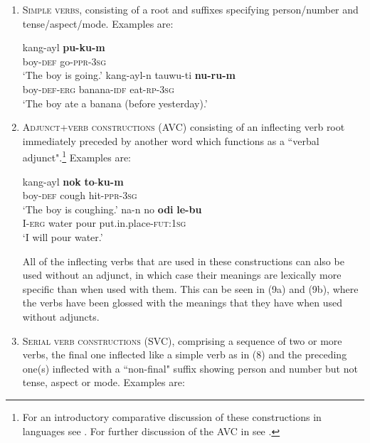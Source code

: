 \documentclass[output=paper]{langsci/langscibook}
\begin{document}
\begin{enumerate}
\item  \textsc{Simple verbs,} consisting of a root and suffixes specifying person/number and tense/aspect/mode. Examples are:

\ea
\ea
\gll   kang-ayl      \textbf{pu-ku-m}   \\
            boy-\textsc{def}      go-\textsc{ppr}-\textsc{3sg}     \\
\glt            `The boy is going.'                   
\ex
\gll kang-ayl-n       tauwu-ti      \textbf{nu-ru-m}\\
       boy-\textsc{def}-\textsc{erg}    banana-\textsc{idf}  eat-\textsc{rp}-\textsc{3sg}\\
\glt  `The boy ate a banana (before yesterday).'
\z
\z

 \item  \textsc{Adjunct+verb constructions (AVC)} consisting of an inflecting verb root immediately preceded by another word which functions as a  ``verbal adjunct".\footnote{For an introductory comparative discussion of these constructions in  languages see \citet[117--123]{Foley1986}. For further discussion of the AVC in  see \citet{MerlanForthcoming}.} Examples are: 

\ea
  \ea
  \gll kang-ayl      \textbf{nok}      \textbf{to}-\textbf{ku-m}     \\
      boy-\textsc{def}      cough    hit-\textsc{ppr}-\textsc{3sg}            \\
\glt	      `The boy is coughing.'
  \ex
      \gll na-n    no      \textbf{odi}   \textbf{le-bu}\\
	I-\textsc{erg}  water  pour    put.in.place-\textsc{fut}:\textsc{1sg}\\
  \glt `I will pour water.'
  \z
\z

All of the inflecting verbs that are used in these constructions can also be used without an adjunct, in which case their meanings are lexically more specific than when used with them. This can be seen in (9a) and (9b), where the verbs have been glossed with the meanings that they have when used without adjuncts. 

 \item \textsc{Serial verb constructions (SVC)}, comprising a sequence of two or more verbs, the final one inflected like a simple verb as in (8) and the preceding one(s) inflected with a ``non-final" suffix showing person and number but not tense, aspect or mode. Examples are:


\end{enumerate}
\end{document}
